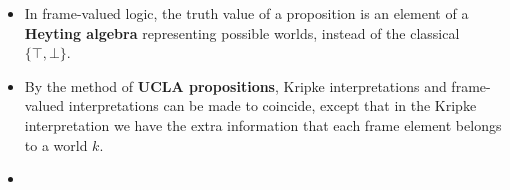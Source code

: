\begin{preview}
\begin{minipage}{\textwidth}
\begin{itemize}
	\item In frame-valued logic, the truth value of a proposition is an element of a \textbf{Heyting algebra} representing possible worlds, instead of the classical $\{ \top, \bot \}$.
	
	\item By the method of \textbf{UCLA propositions}, Kripke interpretations and frame-valued interpretations can be made to coincide, except that in the Kripke interpretation we have the extra information that each frame element belongs to a world $k$.
	
	\item 
\end{itemize}

\end{minipage}
\end{preview}

